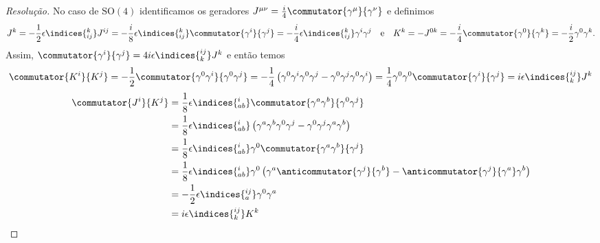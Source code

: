 \begin{proof}[Resolução]
    No caso de \(\mathrm{SO}(4)\) identificamos os geradores \(J^{\mu\nu} = \frac{i}{4} \commutator{\gamma^\mu}{\gamma^\nu}\) e definimos
    \begin{equation*}
        J^k = -\frac12\epsilon\indices{^k_{ij}} J^{i j} = -\frac{i}{8} \epsilon\indices{^k_{ij}} \commutator{\gamma^i}{\gamma^j} = -\frac{i}{4} \epsilon\indices{^k_{ij}} \gamma^i \gamma^j
        \quad\text{e}\quad
        K^k = -J^{0k} = -\frac{i}{4} \commutator{\gamma^0}{\gamma^k} = -\frac{i}{2} \gamma^0 \gamma^k.
    \end{equation*}
    Assim, \(\commutator{\gamma^i}{\gamma^j} = 4i \epsilon\indices{^{ij}_k} J^k\) e então temos \todo[Refazer]
    \begin{equation*}
        \commutator{K^i}{K^j} = -\frac{1}{2} \commutator{\gamma^0 \gamma^i}{\gamma^0\gamma^j}
                              = -\frac{1}{4} \left(\gamma^0 \gamma^i \gamma^0 \gamma^j - \gamma^0 \gamma^j \gamma^0 \gamma^i\right)
                              = \frac{1}{4} \gamma^0 \gamma^0 \commutator{\gamma^i}{\gamma^j}
                              = i \epsilon\indices{^{ij}_k} J^k
    \end{equation*}
    \begin{align*}
        \commutator{J^i}{K^j} &= \frac{1}{8} \epsilon\indices{^i_{ab}} \commutator{\gamma^a \gamma^b}{\gamma^0\gamma^j}\\
                              &= \frac18 \epsilon\indices{^i_{ab}} \left(\gamma^a \gamma^b \gamma^0 \gamma^j - \gamma^0 \gamma^j \gamma^a \gamma^b\right)\\
                              &= \frac18 \epsilon\indices{^i_{ab}} \gamma^0\commutator{\gamma^a \gamma^b}{\gamma^j}\\
                              &= \frac18 \epsilon\indices{^i_{ab}} \gamma^0\left(\gamma^a\anticommutator{\gamma^j}{\gamma^b} - \anticommutator{\gamma^j}{\gamma^a} \gamma^b\right)\\
                              &= -\frac12 \epsilon\indices{^{ij}_a} \gamma^0 \gamma^a\\
                              &= i \epsilon\indices{^{ij}_k}K^k
    \end{align*}
    
\end{proof}
